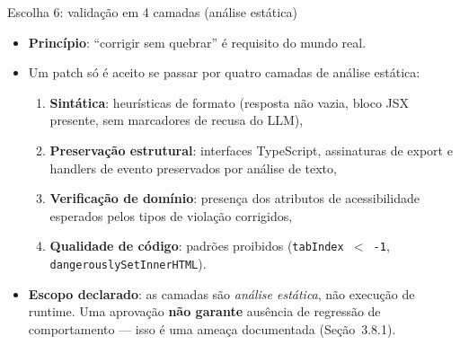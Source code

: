 \documentclass[aspectratio=169]{beamer}
\begin{document}
\begin{frame}{Escolha 6: validação em 4 camadas (análise estática)}
\small
\begin{itemize}
  \item \textbf{Princípio}: ``corrigir sem quebrar'' é requisito do mundo real.
  \item Um patch só é aceito se passar por quatro camadas de análise estática:
  \begin{enumerate}
    \item \textbf{Sintática}: heurísticas de formato (resposta não vazia,
          bloco JSX presente, sem marcadores de recusa do LLM),
    \item \textbf{Preservação estrutural}: interfaces TypeScript, assinaturas de
          export e handlers de evento preservados por análise de texto,
    \item \textbf{Verificação de domínio}: presença dos atributos de
          acessibilidade esperados pelos tipos de violação corrigidos,
    \item \textbf{Qualidade de código}: padrões proibidos
          (\texttt{tabIndex~$<$~-1}, \texttt{dangerouslySetInnerHTML}).
  \end{enumerate}
  \item \textbf{Escopo declarado}: as camadas são \emph{análise estática},
        não execução de runtime.
        Uma aprovação \textbf{não garante} ausência de regressão de
        comportamento --- isso é uma ameaça documentada (Seção~3.8.1).
\end{itemize}
\end{frame}
\end{document}
